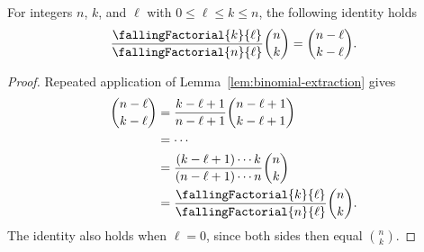 \begin{lemma}
  \label{lem:continuous-binomial-extraction}
  For integers $n$, $k$, and $\ell$ with $0 \leq \ell \leq k \leq n$, the following identity holds
  \begin{align*}
    \frac{\fallingFactorial{k}{\ell}}{\fallingFactorial{n}{\ell}}
    \binom{n}{k}
    = \binom{n-\ell}{k-\ell}.
  \end{align*}
  \begin{proof}
    Repeated application of Lemma~\ref{lem:binomial-extraction} gives
    \begin{align*}
      \binom{n-\ell}{k-\ell}
      &= \frac{k-\ell+1}{n-\ell+1}\binom{n-\ell+1}{k-\ell+1} \\
      &= \cdots \\
      &= \frac{(k-\ell+1)\cdots k}{(n-\ell+1)\cdots n}\binom{n}{k} \\
      &= \frac{\fallingFactorial{k}{\ell}}{\fallingFactorial{n}{\ell}}\binom{n}{k}.
    \end{align*}
    The identity also holds when $\ell=0$, since both sides then equal $\binom{n}{k}$.
  \end{proof}
\end{lemma}
